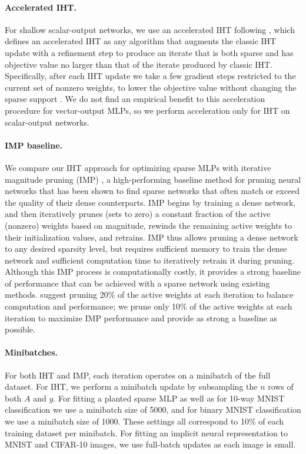 \documentclass{article} %
\newcommand{\measurement}{y}
\newcommand{\n}{\ensuremath{n}}
\newcommand{\1}{\ensuremath{{\sf (i)}}}
\newcommand{\2}{\ensuremath{{\sf (ii)}}}
\newcommand{\3}{\ensuremath{{\sf (iii)}}}
\newcommand{\4}{\ensuremath{{\sf (iv)}}}
\newcommand{\5}{\ensuremath{{\sf (v)}}}
\newcommand{\6}{\ensuremath{{\sf (vi)}}}
\begin{document}
\paragraph{Accelerated IHT.}
For shallow scalar-output networks, we use an accelerated IHT following \citet{blumensath2012accelerated}, which defines an accelerated IHT as any algorithm that augments the classic IHT update with a refinement step to produce an iterate that is both sparse and has objective value no larger than that of the iterate produced by classic IHT. Specifically, after each IHT update we take a few gradient steps restricted to the current set of nonzero weights, to lower the objective value without changing the sparse support \citep{blumensath2012accelerated}. We do not find an empirical benefit to this acceleration procedure for vector-output MLPs, so we perform acceleration only for IHT on scalar-output networks.


\paragraph{IMP baseline.}
We compare our IHT approach for optimizing sparse MLPs with iterative magnitude pruning (IMP) \citep{frankle2018lottery}, a high-performing baseline method for pruning neural networks that has been shown to find sparse networks that often match or exceed the quality of their dense counterparts. IMP begins by training a dense network, and then iteratively prunes (sets to zero) a constant fraction of the active (nonzero) weights based on magnitude, rewinds the remaining active weights to their initialization values, and retrains. IMP thus allows pruning a dense network to any desired sparsity level, but requires sufficient memory to train the dense network and sufficient computation time to iteratively retrain it during pruning. Although this IMP process is computationally costly, it provides a strong baseline of performance that can be achieved with a sparse network using existing methods. \citet{frankle2018lottery} suggest pruning 20\% of the active weights at each iteration to balance computation and performance; we prune only 10\% of the active weights at each iteration to maximize IMP performance and provide as strong a baseline as possible. 


\paragraph{Minibatches.}
For both IHT and IMP, each iteration operates on a minibatch of the full dataset. For IHT, we perform a minibatch update by subsampling the $\n$ rows of both $A$ and $\measurement$. For fitting a planted sparse MLP as well as for 10-way MNIST classification we use a minibatch size of 5000, and for binary MNIST classification we use a minibatch size of 1000. These settings all correspond to 10\% of each training dataset per minibatch.
For fitting an implicit neural representation to MNIST and CIFAR-10 images, we use full-batch updates as each image is small.
\end{document}
